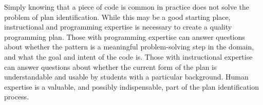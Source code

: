 Simply knowing that a piece of code is common in practice does not solve the problem of plan identification. While this may be a good starting place, instructional and programming expertise is necessary to create a quality programming plan. Those with programming expertise can answer questions about whether the pattern is a meaningful problem-solving step in the domain, and what the goal and intent of the code is. Those with instructional expertise can answer questions about whether the current form of the plan is understandable and usable by students with a particular background. Human expertise is a valuable, and possibly indispensable, part of the plan identification process.

 











